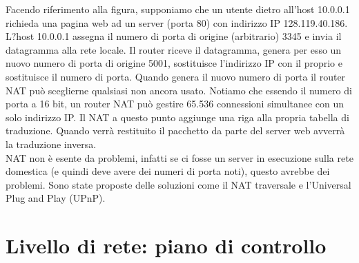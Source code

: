 \documentclass[11pt,a4paper]{book}
\begin{document}
Facendo riferimento alla figura, supponiamo che un utente dietro all'host 10.0.0.1 richieda una pagina web ad un server (porta 80) con indirizzo IP 128.119.40.186. L?host 10.0.0.1 assegna il numero di porta di origine (arbitrario) 3345 e invia il datagramma alla rete locale. Il router riceve il datagramma, genera per esso un nuovo numero di porta di origine 5001, sostituisce l'indirizzo IP con il proprio e sostituisce il numero di porta. Quando genera il nuovo numero di porta il router NAT può sceglierne qualsiasi non ancora usato. Notiamo che essendo il numero di porta a 16 bit, un router NAT può gestire 65.536 connessioni simultanee con un solo indirizzo IP. Il NAT a questo punto aggiunge una riga alla propria tabella di traduzione. Quando verrà restituito il pacchetto da parte del server web avverrà la traduzione inversa. \\
NAT non è esente da problemi, infatti se ci fosse un server in esecuzione sulla rete domestica (e quindi deve avere dei numeri di porta noti), questo avrebbe dei problemi. Sono state proposte delle soluzioni come il NAT traversale e l'Universal Plug and Play (UPnP).

\chapter{Livello di rete: piano di controllo}
\end{document}
